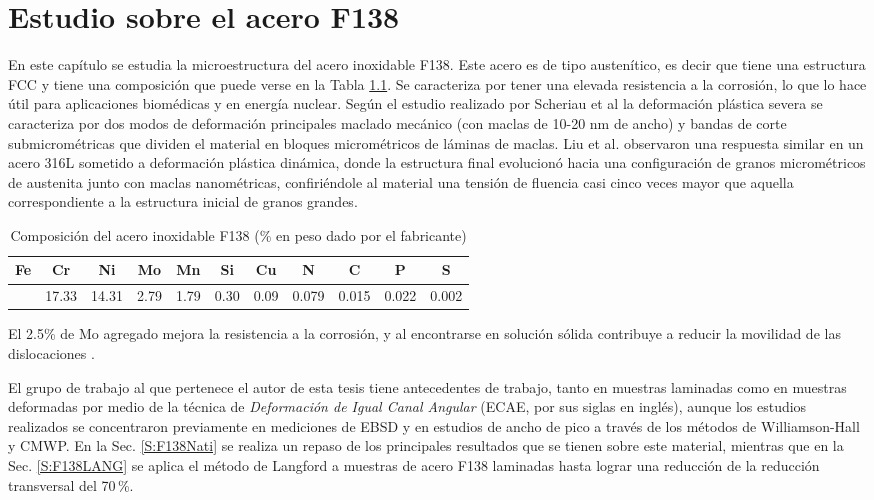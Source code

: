 \chapter{Estudio sobre el acero F138}\label{C:F138}
\graphicspath{{./figs/04_F138/}}

En este capítulo se estudia la microestructura del acero inoxidable F138.
Este acero es de tipo austenítico, es decir que tiene una estructura FCC y tiene una composición que puede verse en la Tabla \ref{tab:F138Comp}.
Se caracteriza por tener una elevada resistencia a la corrosión, lo que lo hace útil para aplicaciones biomédicas y en energía nuclear.
Según el estudio realizado por Scheriau et al \cite{Scheriau2011} la deformación plástica severa se caracteriza por dos modos de deformación principales maclado mecánico (con maclas de 10-20 nm de ancho) y bandas de corte submicrométricas que dividen el material en bloques micrométricos de láminas de maclas.
Liu et al. \cite{Liu2010} observaron una respuesta similar en un acero 316L sometido a deformación plástica dinámica, donde la estructura final evolucionó hacia una configuración de granos micrométricos de austenita junto con maclas nanométricas, confiriéndole al material una tensión de fluencia casi cinco veces mayor que aquella correspondiente a la estructura inicial de granos grandes.

\begin{table}[!htb]
\centering
\caption{Composición del acero inoxidable F138 (\% en peso dado por el fabricante)}
\label{tab:F138Comp}
\begin{tabular}{|c|c|c|c|c|c|c|c|c|c|c|}
\hline
\rowcolor[HTML]{BBDAFF} 
\textbf{Fe} & \textbf{Cr} & \textbf{Ni} & \textbf{Mo} & \textbf{Mn} & \textbf{Si} & \textbf{Cu} & \textbf{N} & \textbf{C} & \textbf{P} & \textbf{S} \\ \hline
          &    17.33  &   14.31   &   2.79    &   1.79    &  0.30     &   0.09    &   0.079   &  0.015    &   0.022   &   0.002   \\ \hline
\end{tabular}
\end{table}

El 2.5\% de Mo agregado mejora la resistencia a la corrosión, y al encontrarse en solución sólida contribuye a reducir la movilidad de las dislocaciones \cite{Chowdhury2005}.

El grupo de trabajo al que pertenece el autor de esta tesis tiene antecedentes de trabajo, tanto en muestras laminadas como en muestras deformadas por medio de la técnica de \textit{Deformación de Igual Canal Angular} (ECAE, por sus siglas en inglés)\cite{Devincentis2015PhD,Devincentis2017}, aunque los estudios realizados se concentraron previamente en mediciones de EBSD y en estudios de ancho de pico a través de los métodos de Williamson-Hall y CMWP.
En la Sec. \ref{S:F138Nati} se realiza un repaso de los principales resultados que se tienen sobre este material, mientras que en la Sec. \ref{S:F138LANG} se aplica el método de Langford a muestras de acero F138 laminadas hasta lograr una reducción de la reducción transversal del 70\,\%.

